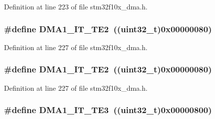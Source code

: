 Definition at line 223 of file stm32f10x\+\_\+dma.\+h.

\subsubsection[{\texorpdfstring{D\+M\+A1\+\_\+\+I\+T\+\_\+\+T\+E2}{DMA1_IT_TE2}}]{\setlength{\rightskip}{0pt plus 5cm}\#define D\+M\+A1\+\_\+\+I\+T\+\_\+\+T\+E2~(({\bf uint32\+\_\+t})0x00000080)}\hypertarget{group___d_m_a__interrupts__definition_ga24e2ed429ff0c0b03c7fec8f4bc8bcc8}{}\label{group___d_m_a__interrupts__definition_ga24e2ed429ff0c0b03c7fec8f4bc8bcc8}


Definition at line 227 of file stm32f10x\+\_\+dma.\+h.

\subsubsection[{\texorpdfstring{D\+M\+A1\+\_\+\+I\+T\+\_\+\+T\+E2}{DMA1_IT_TE2}}]{\setlength{\rightskip}{0pt plus 5cm}\#define D\+M\+A1\+\_\+\+I\+T\+\_\+\+T\+E2~(({\bf uint32\+\_\+t})0x00000080)}\hypertarget{group___d_m_a__interrupts__definition_ga24e2ed429ff0c0b03c7fec8f4bc8bcc8}{}\label{group___d_m_a__interrupts__definition_ga24e2ed429ff0c0b03c7fec8f4bc8bcc8}


Definition at line 227 of file stm32f10x\+\_\+dma.\+h.

\subsubsection[{\texorpdfstring{D\+M\+A1\+\_\+\+I\+T\+\_\+\+T\+E3}{DMA1_IT_TE3}}]{\setlength{\rightskip}{0pt plus 5cm}\#define D\+M\+A1\+\_\+\+I\+T\+\_\+\+T\+E3~(({\bf uint32\+\_\+t})0x00000800)}\hypertarget{group___d_m_a__interrupts__definition_ga54e8f93512a446fcaf2b10cd92f81379}{}\label{group___d_m_a__interrupts__definition_ga54e8f93512a446fcaf2b10cd92f81379}


